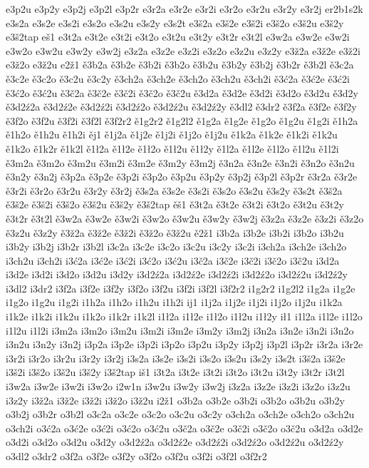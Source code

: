 {e3p2u
e3p2y
e3p2j
e3p2l
e3p2r
e3r2a
e3r2e
e3r2i
e3r2o
e3r2u
e3r2y
e3r2j
er2b1s2k
e3s2a
e3s2e
e3s2i
e3s2o
e3s2u
e3s2y
e3s2t
e3š2a
e3š2e
e3š2i
e3š2o
e3š2u
e3š2y
e3š2tap
eš1
e3t2a
e3t2e
e3t2i
e3t2o
e3t2u
e3t2y
e3t2r
e3t2l
e3w2a
e3w2e
e3w2i
e3w2o
e3w2u
e3w2y
e3w2j
e3z2a
e3z2e
e3z2i
e3z2o
e3z2u
e3z2y
e3ž2a
e3ž2e
e3ž2i
e3ž2o
e3ž2u
e2ž1
ě3b2a
ě3b2e
ě3b2i
ě3b2o
ě3b2u
ě3b2y
ě3b2j
ě3b2r
ě3b2l
ě3c2a
ě3c2e
ě3c2o
ě3c2u
ě3c2y
ě3ch2a
ě3ch2e
ě3ch2o
ě3ch2u
ě3ch2i
ě3ć2a
ě3ć2e
ě3ć2i
ě3ć2o
ě3ć2u
ě3č2a
ě3č2e
ě3č2i
ě3č2o
ě3č2u
ě3d2a
ě3d2e
ě3d2i
ě3d2o
ě3d2u
ě3d2y
ě3d2ź2a
ě3d2ź2e
ě3d2ź2i
ě3d2ź2o
ě3d2ź2u
ě3d2ź2y
ě3dl2
ě3dr2
ě3f2a
ě3f2e
ě3f2y
ě3f2o
ě3f2u
ě3f2i
ě3f2l
ě3f2r2
ě1g2r2
ě1g2l2
ě1g2a
ě1g2e
ě1g2o
ě1g2u
ě1g2i
ě1h2a
ě1h2o
ě1h2u
ě1h2i
ěj1
ě1j2a
ě1j2e
ě1j2i
ě1j2o
ě1j2u
ě1k2a
ě1k2e
ě1k2i
ě1k2u
ě1k2o
ě1k2r
ě1k2l
ě1ł2a
ě1ł2e
ě1ł2o
ě1ł2u
ě1ł2y
ě1l2a
ě1l2e
ě1l2o
ě1l2u
ě1l2i
ě3m2a
ě3m2o
ě3m2u
ě3m2i
ě3m2e
ě3m2y
ě3m2j
ě3n2a
ě3n2e
ě3n2i
ě3n2o
ě3n2u
ě3n2y
ě3n2j
ě3p2a
ě3p2e
ě3p2i
ě3p2o
ě3p2u
ě3p2y
ě3p2j
ě3p2l
ě3p2r
ě3r2a
ě3r2e
ě3r2i
ě3r2o
ě3r2u
ě3r2y
ě3r2j
ě3s2a
ě3s2e
ě3s2i
ě3s2o
ě3s2u
ě3s2y
ě3s2t
ě3š2a
ě3š2e
ě3š2i
ě3š2o
ě3š2u
ě3š2y
ě3š2tap
ěš1
ě3t2a
ě3t2e
ě3t2i
ě3t2o
ě3t2u
ě3t2y
ě3t2r
ě3t2l
ě3w2a
ě3w2e
ě3w2i
ě3w2o
ě3w2u
ě3w2y
ě3w2j
ě3z2a
ě3z2e
ě3z2i
ě3z2o
ě3z2u
ě3z2y
ě3ž2a
ě3ž2e
ě3ž2i
ě3ž2o
ě3ž2u
ě2ž1
i3b2a
i3b2e
i3b2i
i3b2o
i3b2u
i3b2y
i3b2j
i3b2r
i3b2l
i3c2a
i3c2e
i3c2o
i3c2u
i3c2y
i3c2i
i3ch2a
i3ch2e
i3ch2o
i3ch2u
i3ch2i
i3ć2a
i3ć2e
i3ć2i
i3ć2o
i3ć2u
i3č2a
i3č2e
i3č2i
i3č2o
i3č2u
i3d2a
i3d2e
i3d2i
i3d2o
i3d2u
i3d2y
i3d2ź2a
i3d2ź2e
i3d2ź2i
i3d2ź2o
i3d2ź2u
i3d2ź2y
i3dl2
i3dr2
i3f2a
i3f2e
i3f2y
i3f2o
i3f2u
i3f2i
i3f2l
i3f2r2
i1g2r2
i1g2l2
i1g2a
i1g2e
i1g2o
i1g2u
i1g2i
i1h2a
i1h2o
i1h2u
i1h2i
ij1
i1j2a
i1j2e
i1j2i
i1j2o
i1j2u
i1k2a
i1k2e
i1k2i
i1k2u
i1k2o
i1k2r
i1k2l
i1ł2a
i1ł2e
i1ł2o
i1ł2u
i1ł2y
ił1
i1l2a
i1l2e
i1l2o
i1l2u
i1l2i
i3m2a
i3m2o
i3m2u
i3m2i
i3m2e
i3m2y
i3m2j
i3n2a
i3n2e
i3n2i
i3n2o
i3n2u
i3n2y
i3n2j
i3p2a
i3p2e
i3p2i
i3p2o
i3p2u
i3p2y
i3p2j
i3p2l
i3p2r
i3r2a
i3r2e
i3r2i
i3r2o
i3r2u
i3r2y
i3r2j
i3s2a
i3s2e
i3s2i
i3s2o
i3s2u
i3s2y
i3s2t
i3š2a
i3š2e
i3š2i
i3š2o
i3š2u
i3š2y
i3š2tap
iš1
i3t2a
i3t2e
i3t2i
i3t2o
i3t2u
i3t2y
i3t2r
i3t2l
i3w2a
i3w2e
i3w2i
i3w2o
i2w1n
i3w2u
i3w2y
i3w2j
i3z2a
i3z2e
i3z2i
i3z2o
i3z2u
i3z2y
i3ž2a
i3ž2e
i3ž2i
i3ž2o
i3ž2u
i2ž1
o3b2a
o3b2e
o3b2i
o3b2o
o3b2u
o3b2y
o3b2j
o3b2r
o3b2l
o3c2a
o3c2e
o3c2o
o3c2u
o3c2y
o3ch2a
o3ch2e
o3ch2o
o3ch2u
o3ch2i
o3ć2a
o3ć2e
o3ć2i
o3ć2o
o3ć2u
o3č2a
o3č2e
o3č2i
o3č2o
o3č2u
o3d2a
o3d2e
o3d2i
o3d2o
o3d2u
o3d2y
o3d2ź2a
o3d2ź2e
o3d2ź2i
o3d2ź2o
o3d2ź2u
o3d2ź2y
o3dl2
o3dr2
o3f2a
o3f2e
o3f2y
o3f2o
o3f2u
o3f2i
o3f2l
o3f2r2
}
